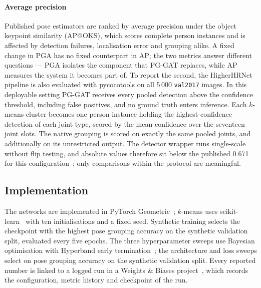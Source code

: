 \paragraph{Average precision}
Published pose estimators are ranked by average precision under the object keypoint similarity (AP@OKS),
which scores complete person instances and is affected by detection failures, localisation error and grouping alike.
A fixed change in PGA has no fixed counterpart in AP;
the two metrics answer different questions ---
PGA isolates the component that PG-GAT replaces, while AP measures the system it becomes part of.
To report the second, the HigherHRNet pipeline is also evaluated with pycocotools on all 5\,000 \texttt{val2017}
images.
In this deployable setting PG-GAT receives every pooled detection above the confidence threshold,
including false positives, and no ground truth enters inference.
Each $k$-means cluster becomes one person instance holding the highest-confidence detection of each joint type,
scored by the mean confidence over the seventeen joint slots.
The native grouping is scored on exactly the same pooled joints, and additionally on its unrestricted output.
The detector wrapper runs single-scale without flip testing, and absolute values therefore sit below
the published 0.671 for this configuration~\citep{cheng2020higherhrnet};
only comparisons within the protocol are meaningful.

\subsection{Implementation}
\label{sec:setup_impl}

The networks are implemented in PyTorch Geometric~\citep{fey2019pyg};
$k$-means uses scikit-learn~\citep{scikitlearn} with ten initialisations and a fixed seed.
Synthetic training selects the checkpoint with the highest pose grouping accuracy on the synthetic validation split, evaluated every five epochs.
The three hyperparameter sweeps use Bayesian optimisation with Hyperband early termination~\citep{li2018hyperband};
the architecture and loss sweeps select on pose grouping accuracy on the synthetic validation split.
Every reported number is linked to a logged run in a Weights \& Biases project~\citep{wandb},
which records the configuration, metric history and checkpoint of the run.